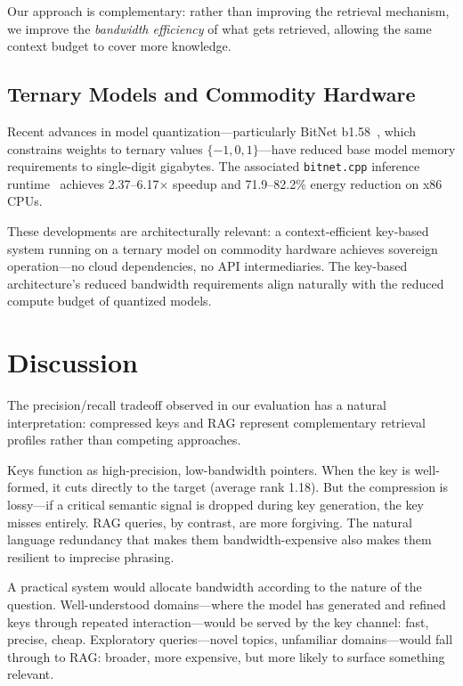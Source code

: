 \documentclass{article}
\begin{document}
Our approach is complementary: rather than improving the retrieval mechanism, we improve the \textit{bandwidth efficiency} of what gets retrieved, allowing the same context budget to cover more knowledge.

\subsection{Ternary Models and Commodity Hardware}

Recent advances in model quantization---particularly BitNet b1.58~\cite{ma2025bitnet}, which constrains weights to ternary values $\{-1, 0, 1\}$---have reduced base model memory requirements to single-digit gigabytes. The associated \texttt{bitnet.cpp} inference runtime~\cite{bitnetcpp2025} achieves 2.37--6.17$\times$ speedup and 71.9--82.2\% energy reduction on x86 CPUs.

These developments are architecturally relevant: a context-efficient key-based system running on a ternary model on commodity hardware achieves sovereign operation---no cloud dependencies, no API intermediaries. The key-based architecture's reduced bandwidth requirements align naturally with the reduced compute budget of quantized models.

\section{Discussion}
\label{sec:discussion}

The precision/recall tradeoff observed in our evaluation has a natural interpretation: compressed keys and RAG represent complementary retrieval profiles rather than competing approaches.

Keys function as high-precision, low-bandwidth pointers. When the key is well-formed, it cuts directly to the target (average rank 1.18). But the compression is lossy---if a critical semantic signal is dropped during key generation, the key misses entirely. RAG queries, by contrast, are more forgiving. The natural language redundancy that makes them bandwidth-expensive also makes them resilient to imprecise phrasing.

A practical system would allocate bandwidth according to the nature of the question. Well-understood domains---where the model has generated and refined keys through repeated interaction---would be served by the key channel: fast, precise, cheap. Exploratory queries---novel topics, unfamiliar domains---would fall through to RAG: broader, more expensive, but more likely to surface something relevant.
\end{document}
